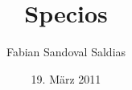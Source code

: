 \subject{Manifest}
\title{Specios}
\author{Fabian Sandoval Saldias}
\date{19. März 2011}
\publishers{\textrm{}\textrm{}}
